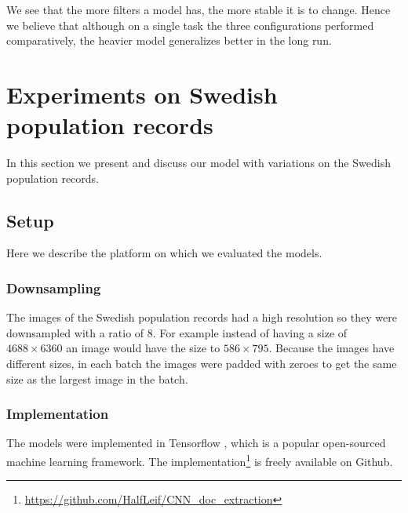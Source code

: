 We see that the more filters a model has, the more stable it is to change. Hence we believe that although on a single task the three configurations performed comparatively, the heavier model generalizes better in the long run.






\section{Experiments on Swedish population records} \label{sec:experiments}

In this section we present and discuss our model with variations on the Swedish population records.

\subsection{Setup}
 Here we describe the platform on which we evaluated the models.

\subsubsection{Downsampling}
The images of the Swedish population records had a high resolution so they were downsampled with a ratio of 8. For example instead of having a size of $4688 \times 6360$ an image would have the size to $586 \times 795$. Because the images have different sizes, in each batch the images were padded with zeroes to get the same size as the largest image in the batch.

\subsubsection{Implementation}
The models were implemented in Tensorflow \cite{Tensorflow}, which is a popular open-sourced machine learning framework. The implementation\footnote{\url{https://github.com/HalfLeif/CNN_doc_extraction}} is freely available on Github.

